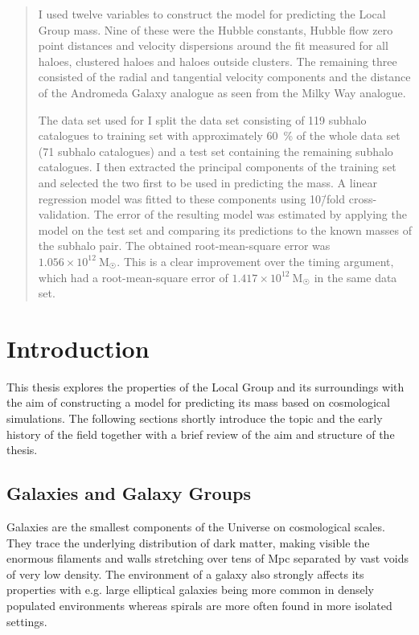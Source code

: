 \documentclass[english, twoside]{HYgradu}
\begin{document}
\begin{abstract}
I used twelve variables to construct the model for predicting the Local Group mass. Nine of these were the Hubble constants, Hubble flow zero point distances and velocity dispersions around the fit measured for all haloes, clustered haloes and haloes outside clusters. The remaining three consisted of the radial and tangential velocity components and the distance of the Andromeda Galaxy analogue as seen from the Milky Way analogue.

The data set used for I split the data set consisting of 119 subhalo catalogues to training set with approximately 60~\% of the whole data set (71 subhalo catalogues) and a test set containing the remaining subhalo catalogues. I then extracted the principal components of the training set and selected the two first to be used in predicting the mass. A linear regression model was fitted to these components using 10\=/fold cross-validation. The error of the resulting model was estimated by applying the model on the test set and comparing its predictions to the known masses of the subhalo pair. The obtained root-mean-square error was $1.056 \times 10^{12}\ \mathrm{M}_{\astrosun}$. This is a clear improvement over the timing argument, which had a root-mean-square error of $1.417 \times 10^{12}\ \mathrm{M}_{\astrosun}$ in the same data set.
\end{abstract}


\mytableofcontents

\chapter{Introduction}
This thesis explores the properties of the Local Group and its surroundings with the aim of constructing a model for predicting its mass based on cosmological simulations. The following sections shortly introduce the topic and the early history of the field together with a brief review of the aim and structure of the thesis.

\section{Galaxies and Galaxy Groups}
Galaxies are the smallest components of the Universe on cosmological scales. They trace the underlying distribution of dark matter, making visible the enormous filaments and walls stretching over tens of Mpc separated by vast voids of very low density. The environment of a galaxy also strongly affects its properties with e.g. large elliptical galaxies being more common in densely populated environments whereas spirals are more often found in more isolated settings.
\end{document}
